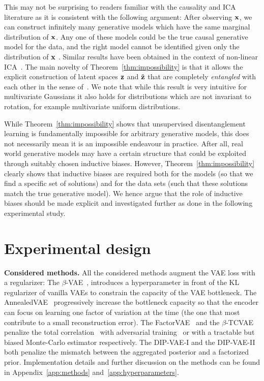 \documentclass{article}
\begin{document}
This may not be surprising to readers familiar with the causality and ICA literature as it is consistent with the following argument: 
After observing ${\mathbf{x}}$, we can construct infinitely many generative models which have the same marginal distribution of ${\mathbf{x}}$.
Any one of these models could be the true causal generative model for the data, and the right model cannot be identified given only the distribution of ${\mathbf{x}}$ \citep{peters2017elements}.
Similar results have been obtained in the context of non-linear ICA~\citep{hyvarinen1999nonlinear}. 
The main novelty of Theorem~\ref{thm:impossibility} is that it allows the explicit construction of latent spaces ${\mathbf{z}}$ and $\hat{{\mathbf{z}}}$ that are completely \textit{entangled} with each other in the sense of~\citep{bengio2013representation}.
We note that while this result is very intuitive for multivariate Gaussians it also holds for distributions which are not invariant to rotation, for example multivariate uniform distributions.

While Theorem~\ref{thm:impossibility} shows that unsupervised disentanglement learning is fundamentally impossible for arbitrary generative models, this does not necessarily mean it is an impossible endeavour in practice.
After all, real world generative models may have a certain structure that could be exploited through suitably chosen inductive biases.
However, Theorem~\ref{thm:impossibility} clearly shows that inductive biases are required both for the models (so that we find a specific set of solutions) and for the data sets (such that these solutions match the true generative model).
We hence argue that the role of inductive biases should be made explicit and investigated further as done in the following experimental study.


\section{Experimental design}\label{sec:experimental_design}
\textbf{Considered methods.} All the considered methods augment the VAE loss with a regularizer: The $\beta$-VAE~\citep{higgins2016beta}, introduces a hyperparameter in front of the KL regularizer of vanilla VAEs to constrain the capacity of the VAE bottleneck.
The AnnealedVAE~\citep{burgess2018understanding} progressively increase the bottleneck capacity so that the encoder can focus on learning one factor of variation at the time (the one that most contribute to a small reconstruction error). The FactorVAE~\citep{kim2018disentangling} and the $\beta$-TCVAE~\citep{chen2018isolating} penalize the total correlation~\citep{watanabe1960information} with adversarial training~\citep{nguyen2010estimating,sugiyama2012density} or with a tractable but biased Monte-Carlo estimator respectively.
The DIP-VAE-I and the DIP-VAE-II~\citep{kumar2017variational} both penalize the mismatch between the aggregated posterior and a factorized prior.
Implementation details and further discussion on the methods can be found in Appendix~\ref{app:methods} and~\ref{app:hyperparameters}.
\end{document}
